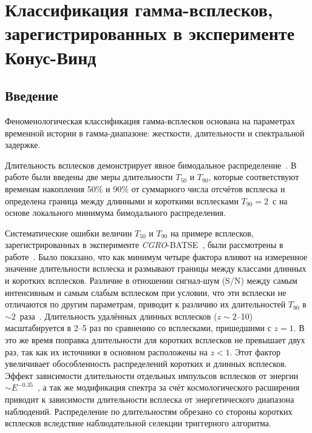 \chapter{Классификация гамма-всплесков, зарегистрированных в эксперименте Конус-Винд}

\section{Введение}
Феноменологическая классификация  гамма-всплесков основана на параметрах 
временной истории в гамма-диапазоне: жесткости, длительности и спектральной задержке. 

Длительность всплесков демонстрирует явное бимодальное 
распределение~\citep{Mazets_1981_part_1,Norris_1984,Kouveliotou_1993,Aptekar_1998}. 
В работе \citep{Kouveliotou_1993} были введены две меры длительности $T_{50}$ и $T_{90}$, 
которые соответствуют временам накопления 50\% и 90\% от суммарного числа отсчётов 
всплеска и определена граница между длинными и короткими всплесками $T_{90}=2$~с 
на основе локального минимума бимодального распределения. 

Систематические ошибки величин $T_{50}$ и $T_{90}$ на примере всплесков, 
зарегистрированных в эксперименте \textit{CGRO}-BATSE~\citep{Fishman_1994}, 
были рассмотрены в работе~\citep{Norris_and_Bonnel_2006}. Было показано, 
что как минимум четыре фактора влияют на измеренное значение длительности 
всплеска и размывают границы между классами длинных и коротких всплесков. 
Различие в отношении сигнал-шум (S/N) между самым интенсивным и самым слабым 
всплеском  при условии, что эти всплески не отличаются по другим параметрам, 
приводит к различию их длительностей $T_{90}$ в $\sim2$~раза~\citep{Bonnell_1997}. 
Длительность удалённых длинных всплесков ($z\sim2$--10)  масштабируется в 2--5 раз 
по сравнению со всплесками, пришедшими с $z=1$. В это же время поправка длительности 
для коротких всплесков не превышает двух раз, так как их источники в основном 
расположены на $z<1$. Этот фактор увеличивает обособленность распределений 
коротких и длинных всплесков. Эффект зависимости длительности отдельных импульсов 
всплесков от энергии $\sim E^{-0.35}$~\citep{Fenimore_1995}, а так же  модификация 
спектра за счёт космологического расширения приводит к зависимости длительности 
всплеска от энергетического диапазона наблюдений. Распределение по длительностям 
обрезано со стороны коротких всплесков вследствие наблюдательной селекции триггерного 
алгоритма. 

